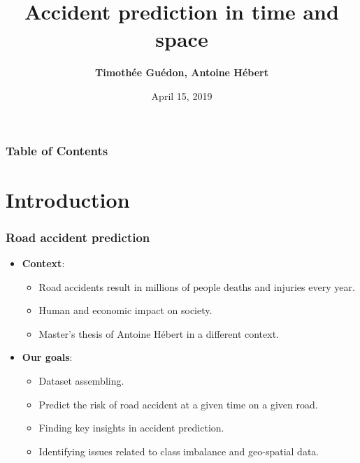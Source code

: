 \documentclass[slidestop,compress,red,mathserif]{beamer}
\title[My Title]{Accident prediction in time and space}
\author[My~Name]{
\textbf{Timothée Guédon, Antoine Hébert}}
\institute[My Institute/company]
{Concordia University \\ Computer Science and Software Engineering Department}
\date[]{April 15, 2019}
\begin{document}
\begin{frame} %
\titlepage
\end{frame}


\begin{frame}
\frametitle{Table of Contents}
\tableofcontents
\end{frame}


\section{Introduction}


\begin{frame}
\frametitle{Road accident prediction}

\begin{scriptsize}

\begin{itemize}
\item[] \textbf{Context}:
  \begin{itemize}
    \item Road accidents result in millions of people deaths and injuries every year.
		\item Human and economic impact on society.
    \item Master’s thesis of Antoine Hébert in a different context.
  \end{itemize}

\item[] \textbf{Our goals}:
  \begin{itemize}
    \item Dataset assembling.
    \item Predict the risk of road accident at a given time on a given road.
  	\item Finding key insights in accident prediction.
  	\item Identifying issues related to class imbalance and geo-spatial data.
  \end{itemize}
\end{itemize}

\end{scriptsize}

\end{frame}
\end{document}
